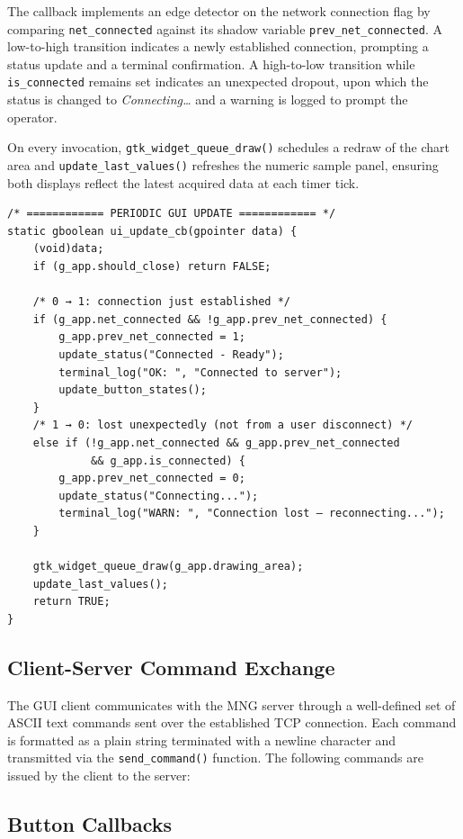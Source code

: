 The callback implements an edge detector on the network connection flag
by comparing \texttt{net\_connected} against its shadow variable
\texttt{prev\_net\_connected}. A low-to-high transition indicates a
newly established connection, prompting a status update and a terminal
confirmation. A high-to-low transition while \texttt{is\_connected}
remains set indicates an unexpected dropout, upon which the status is
changed to \emph{Connecting\ldots} and a warning is logged to prompt
the operator.

On every invocation, \texttt{gtk\_widget\_queue\_draw()} schedules a
redraw of the chart area and \texttt{update\_last\_values()} refreshes
the numeric sample panel, ensuring both displays reflect the latest
acquired data at each timer tick.
\begin{verbatim}
/* ============ PERIODIC GUI UPDATE ============ */
static gboolean ui_update_cb(gpointer data) {
    (void)data;
    if (g_app.should_close) return FALSE;

    /* 0 → 1: connection just established */
    if (g_app.net_connected && !g_app.prev_net_connected) {
        g_app.prev_net_connected = 1;
        update_status("Connected - Ready");
        terminal_log("OK: ", "Connected to server");
        update_button_states();
    }
    /* 1 → 0: lost unexpectedly (not from a user disconnect) */
    else if (!g_app.net_connected && g_app.prev_net_connected
             && g_app.is_connected) {
        g_app.prev_net_connected = 0;
        update_status("Connecting...");
        terminal_log("WARN: ", "Connection lost — reconnecting...");
    }

    gtk_widget_queue_draw(g_app.drawing_area);
    update_last_values();
    return TRUE;
}
\end{verbatim}

\subsection{Client-Server Command Exchange}

The GUI client communicates with the MNG server through a well-defined set of ASCII
text commands sent over the established TCP connection. Each command is formatted as
a plain string terminated with a newline character and transmitted via the
\texttt{send\_command()} function. The following commands are issued by the client
to the server:

\subsection{Button Callbacks}

